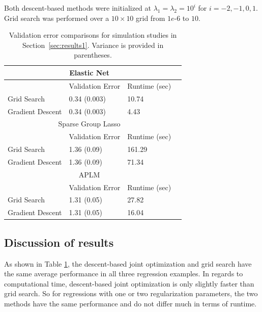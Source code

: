\documentclass{statsoc}
\begin{document}
Both descent-based methods were initialized at $\lambda_1 = \lambda_2 = 10^i$ for $i=-2, -1, 0, 1$. Grid search was performed over a $10 \times 10$ grid from $1e\text{-}6$ to $10$.
\begin{table}
\caption{\label{table:validation} Validation error comparisons for simulation studies in Section~\ref{sec:results1}. Variance is provided in parentheses.}
\centering
\begin{tabular}{| l | l | l | l | }
\hline
\multicolumn{3}{|c|}{Elastic Net}\\
\hline
 & Validation Error & Runtime (sec) \\
\hline
Grid Search & 0.34 (0.003) & 10.74\\
\hline
Gradient Descent & 0.34 (0.003) & 4.43 \\
\hline
\multicolumn{3}{|c|}{Sparse Group Lasso}\\
\hline
 & Validation Error & Runtime (sec) \\
\hline
Grid Search & 1.36 (0.09) & 161.29 \\
\hline
Gradient Descent  & 1.36 (0.09) & 71.34 \\
\hline
\multicolumn{3}{|c|}{APLM}\\
\hline
 & Validation Error & Runtime (sec) \\
\hline
Grid Search  & 1.31 (0.05) & 27.82 \\
\hline
Gradient Descent  & 1.31 (0.05) & 16.04 \\
\hline
\end{tabular}
\end{table}

\subsection{Discussion of results}
As shown in Table \ref{table:validation}, the descent-based joint optimization and grid search have the same average performance in all three regression examples. In regards to computational time, descent-based joint optimization is only slightly faster than grid search. So for regressions with one or two regularization parameters, the two methods have the same performance and do not differ much in terms of runtime.
\end{document}
